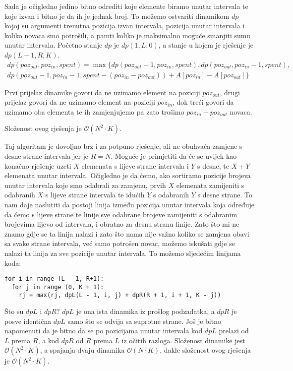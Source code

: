 \documentclass[a4paper]{article}
\begin{document}
Sada je očigledno jedino bitno odrediti koje elemente biramo unutar intervala
te koje izvan i bitno je da ih je jednak broj. To možemo ostvariti dinamikom $dp$
kojoj su argumenti trenutna pozicija izvan intervala, pozicija unutar intervala
i koliko novaca smo potrošili, a pamti koliko je maksimalno moguće smanjiti
sumu unutar intervala. Početno stanje $dp$ je $dp(1, L, 0)$, a stanje u kojem je
rješenje je $dp(L - 1, R, K)$.
\begin{multline}
  dp(poz_{out}, poz_{in}, spent) = \max \biggl\{ dp(poz_{out} - 1, poz_{in}, spent),
  dp(poz_{out}, poz_{in} - 1, spent),\\
  dp(poz_{out} - 1, poz_{in} - 1, spent - (poz_{in} - poz_{out})) + A[poz_{in}] - A[poz_{out}] \biggr\}
\end{multline}

Prvi prijelaz dinamike govori da ne uzimamo element na poziciji $poz_{out}$, drugi
prijelaz govori da ne uzimamo element na poziciji $poz_{in}$, dok treći govori da
uzimamo oba elementa te ih zamjenjujemo pa zato trošimo $poz_{in} - poz_{out}$
novaca.

Složenost ovog rješenja je $\mathcal{O}(N^2 \cdot K)$.

Taj algoritam je dovoljno brz i za potpuno rješenje, ali ne obuhvaća zamjene s
desne strane intervala jer je $R = N$. Moguće je primjetiti da će se uvijek kao
konačno rješenje uzeti $X$ elemenata s lijeve strane intervala i $Y$ s desne, te $X
+ Y$ elemenata unutar intervala. Očigledno je da ćemo, ako sortiramo pozicije
brojeva unutar intervala koje smo odabrali za zamjenu, prvih $X$ elemenata
zamijeniti s odabranih $X$ s lijeve strane intervala te idućih $Y$ s odabranih $Y$ s
desne strane. To nam daje naslutiti da postoji linija između pozicija unutar
intervala koja određuje da ćemo s lijeve strane te linije sve odabrane brojeve
zamijeniti s odabranim brojevima lijevo od intervala, i obratno za desnu stranu
linije. Zato što mi ne znamo gdje se ta linija nalazi i zato što nama nije
važno koliko se zamjena obavi sa svake strane intervala, već samo potrošen
novac, možemo iskušati gdje se nalazi ta linija za sve pozicije unutar
intervala. To možemo sljedećim linijama koda:

\vspace{-2ex}
\begin{verbatim}
for i in range (L - 1, R+1):
  for j in range (0, K + 1):
    rj = max(rj, dpL(L - 1, i, j) + dpR(R + 1, i + 1, K - j))
\end{verbatim}

Što su $dpL$ i $dpR$? $dpL$ je ona ista dinamika iz prošlog podzadatka, a $dpR$
je posve identična $dpL$ samo što se odvija sa suprotne strane. Još je bitno
napomenuti da je bitno da se po pozicijama unutar intervala kod $dpL$ prelazi
od $L$ prema $R$, a kod $dpR$ od $R$ prema $L$ iz očitih razloga. Složenost
dinamike jest $\mathcal{O}(N^2 \cdot K)$, a spajanja dvaju dinamika
$\mathcal{O}(N \cdot K)$, dakle složenost ovog rješenja je $\mathcal{O}(N^2
\cdot K)$.
\end{document}
